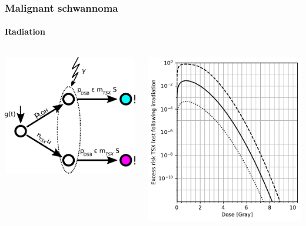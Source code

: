 \documentclass{beamer}
\begin{document}
\begin{frame}
    \frametitle{Malignant schwannoma}
    \framesubtitle{Radiation}


    \begin{columns}
        \begin{column}{0.5\textwidth}
        \includegraphics[width=\textwidth]{figures/radiation-model}
        \end{column}
        \begin{column}{0.5\textwidth}
        \includegraphics[width=\textwidth]{figures/SecondHitVariousTS-oct21}
        \end{column}
    \end{columns}
\end{frame}
\end{document}
